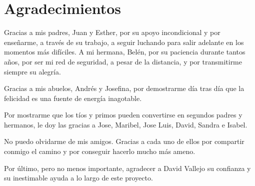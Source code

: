 \chapter{Agradecimientos}

Gracias a mis padres, Juan y Esther, por su apoyo incondicional y por enseñarme, a través de su trabajo, a seguir luchando para salir adelante en los momentos más difíciles. A mi hermana, Belén, por su paciencia durante tantos años, por ser mi red de seguridad, a pesar de la distancia, y por transmitirme siempre su alegría.

Gracias a mis abuelos, Andrés y Josefina, por demostrarme día tras día que la felicidad es una fuente de energía inagotable. 

Por mostrarme que los tíos y primos pueden convertirse en segundos padres y hermanos, le doy las gracias a Jose, Maribel, Jose Luis, David, Sandra e Isabel.

No puedo olvidarme de mis amigos. Gracias a cada uno de ellos por compartir conmigo el camino y por conseguir hacerlo mucho más ameno.

Por último, pero no menos importante, agradecer a David Vallejo su confianza y su inestimable ayuda a lo largo de este proyecto.

